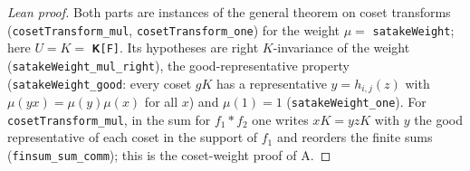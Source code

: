 \begin{proof}[Lean proof]
Both parts are instances of the general theorem on coset transforms (\texttt{cosetTransform\_mul}, \texttt{cosetTransform\_one}) for the weight $\mu=$ \texttt{satakeWeight}; here $U=K=$ \texttt{𝐊[F]}. Its hypotheses are right $K$-invariance of the weight (\texttt{satakeWeight\_mul\_right}), the good-representative property (\texttt{satakeWeight\_good}: every coset $gK$ has a representative $y=h_{i,j}(z)$ with $\mu(yx)=\mu(y)\mu(x)$ for all $x$) and $\mu(1)=1$ (\texttt{satakeWeight\_one}). For \texttt{cosetTransform\_mul}, in the sum for $f_1*f_2$ one writes $xK=yzK$ with $y$ the good representative of each coset in the support of $f_1$ and reorders the finite sums (\texttt{finsum\_sum\_comm}); this is the coset-weight proof of A.
\end{proof}

